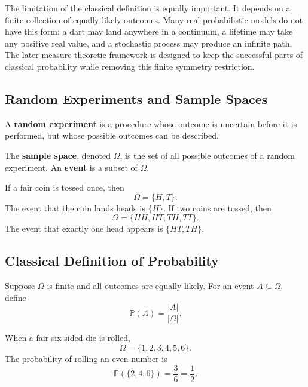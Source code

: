 The limitation of the classical definition is equally important. It depends on a finite collection of equally likely outcomes. Many real probabilistic models do not have this form: a dart may land anywhere in a continuum, a lifetime may take any positive real value, and a stochastic process may produce an infinite path. The later measure-theoretic framework is designed to keep the successful parts of classical probability while removing this finite symmetry restriction.

\subsection{Random Experiments and Sample Spaces}

\begin{definition}
A \textbf{random experiment} is a procedure whose outcome is uncertain before it is performed, but whose possible outcomes can be described.
\end{definition}

\begin{definition}
The \textbf{sample space}, denoted $\Omega$, is the set of all possible outcomes of a random experiment. An \textbf{event} is a subset of $\Omega$.
\end{definition}



\begin{example}
If a fair coin is tossed once, then
\[
    \Omega=\{H,T\}.
\]
The event that the coin lands heads is $\{H\}$. If two coins are tossed, then
\[
    \Omega=\{HH,HT,TH,TT\}.
\]
The event that exactly one head appears is $\{HT,TH\}$.
\end{example}

\subsection{Classical Definition of Probability}

\begin{definition}
Suppose $\Omega$ is finite and all outcomes are equally likely. For an event $A\subseteq\Omega$, define
\[
    \mathbb{P}(A)=\frac{|A|}{|\Omega|}.
\]
\end{definition}

\begin{example}
When a fair six-sided die is rolled,
\[
    \Omega=\{1,2,3,4,5,6\}.
\]
The probability of rolling an even number is
\[
    \mathbb{P}(\{2,4,6\})=\frac{3}{6}=\frac12.
\]
\end{example}

